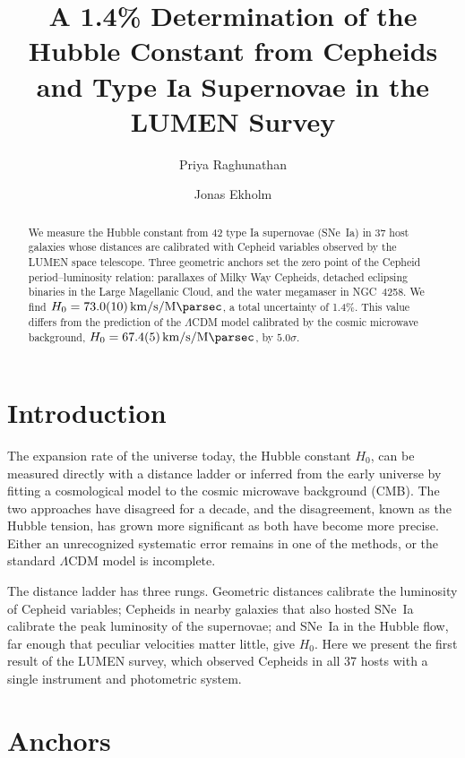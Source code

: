 \documentclass[twocolumn]{aastex631}
\newcommand{\Hnought}{H_0}
\begin{document}
\title{A 1.4\% Determination of the Hubble Constant from Cepheids and Type Ia Supernovae in the LUMEN Survey}

\author{Priya Raghunathan}
\author{Jonas Ekholm}

\begin{abstract}
We measure the Hubble constant from 42 type Ia supernovae (SNe~Ia) in 37 host galaxies whose distances are calibrated with Cepheid variables observed by the LUMEN space telescope. Three geometric anchors set the zero point of the Cepheid period--luminosity relation: parallaxes of Milky Way Cepheids, detached eclipsing binaries in the Large Magellanic Cloud, and the water megamaser in NGC~4258. We find $\Hnought = \SI{73.0 +- 1.0}{\kilo\metre\per\second\per\mega\parsec}$, a total uncertainty of 1.4\%. This value differs from the prediction of the $\Lambda$CDM model calibrated by the cosmic microwave background, $\Hnought = \SI{67.4 +- 0.5}{\kilo\metre\per\second\per\mega\parsec}$, by $5.0\sigma$.
\end{abstract}

\section{Introduction}

The expansion rate of the universe today, the Hubble constant $\Hnought$, can be measured directly with a distance ladder or inferred from the early universe by fitting a cosmological model to the cosmic microwave background (CMB). The two approaches have disagreed for a decade, and the disagreement, known as the Hubble tension, has grown more significant as both have become more precise. Either an unrecognized systematic error remains in one of the methods, or the standard $\Lambda$CDM model is incomplete.

The distance ladder has three rungs. Geometric distances calibrate the luminosity of Cepheid variables; Cepheids in nearby galaxies that also hosted SNe~Ia calibrate the peak luminosity of the supernovae; and SNe~Ia in the Hubble flow, far enough that peculiar velocities matter little, give $\Hnought$. Here we present the first result of the LUMEN survey, which observed Cepheids in all 37 hosts with a single instrument and photometric system.

\section{Anchors}
\end{document}
